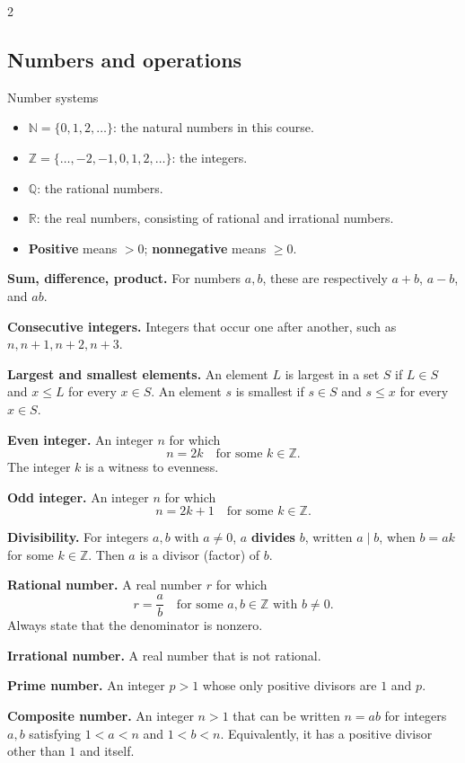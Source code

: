 \documentclass[10pt]{article}
\newcommand{\term}[1]{\textbf{\color{ProofNavy}#1}}
\newcommand{\Z}{\mathbb Z}
\newcommand{\Q}{\mathbb Q}
\newcommand{\R}{\mathbb R}
\newcommand{\N}{\mathbb N}
\begin{document}
\begin{multicols}{2}
\raggedcolumns
\subsection*{Numbers and operations}

\begin{definitionbox}{Number systems}
\begin{itemize}
  \item $\N=\{0,1,2,\ldots\}$: the natural numbers in this course.
  \item $\Z=\{\ldots,-2,-1,0,1,2,\ldots\}$: the integers.
  \item $\Q$: the rational numbers.
  \item $\R$: the real numbers, consisting of rational and irrational numbers.
  \item \term{Positive} means $>0$; \term{nonnegative} means $\ge 0$.
\end{itemize}
\end{definitionbox}

\term{Sum, difference, product.} For numbers $a,b$, these are respectively
$a+b$, $a-b$, and $ab$.

\term{Consecutive integers.} Integers that occur one after another, such as
$n,n+1,n+2,n+3$.

\term{Largest and smallest elements.} An element $L$ is largest in a set $S$
if $L\in S$ and $x\le L$ for every $x\in S$. An element $s$ is smallest if
$s\in S$ and $s\le x$ for every $x\in S$.

\term{Even integer.} An integer $n$ for which
\[
 n=2k\quad\text{for some }k\in\Z.
\]
The integer $k$ is a witness to evenness.

\term{Odd integer.} An integer $n$ for which
\[
 n=2k+1\quad\text{for some }k\in\Z.
\]

\term{Divisibility.} For integers $a,b$ with $a\ne0$, $a$ \term{divides}
$b$, written $a\mid b$, when $b=ak$ for some $k\in\Z$. Then $a$ is a divisor
(factor) of $b$.

\term{Rational number.} A real number $r$ for which
\[
 r=\frac{a}{b}\quad\text{for some }a,b\in\Z\text{ with }b\ne0.
\]
Always state that the denominator is nonzero.

\term{Irrational number.} A real number that is not rational.

\term{Prime number.} An integer $p>1$ whose only positive divisors are $1$
and $p$.

\term{Composite number.} An integer $n>1$ that can be written $n=ab$ for
integers $a,b$ satisfying $1<a<n$ and $1<b<n$. Equivalently, it has a positive
divisor other than $1$ and itself.


\end{multicols}
\end{document}
